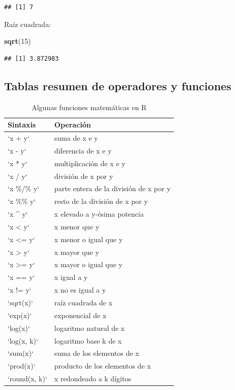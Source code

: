 \documentclass[]{book}
\newenvironment{Shaded}{\begin{snugshade}}{\end{snugshade}}
\newcommand{\KeywordTok}[1]{\textcolor[rgb]{0.13,0.29,0.53}{\textbf{#1}}}
\newcommand{\DecValTok}[1]{\textcolor[rgb]{0.00,0.00,0.81}{#1}}
\newcommand{\NormalTok}[1]{#1}
\begin{document}
\begin{verbatim}
## [1] 7
\end{verbatim}

Raíz cuadrada:

\begin{Shaded}
\begin{Highlighting}[]
\KeywordTok{sqrt}\NormalTok{(}\DecValTok{15}\NormalTok{)}
\end{Highlighting}
\end{Shaded}

\begin{verbatim}
## [1] 3.872983
\end{verbatim}

\hypertarget{tablas_resumen}{%
\subsection{Tablas resumen de operadores y
funciones}\label{tablas_resumen}}

\begin{longtable}[t]{ll}
\caption{\label{tab:funcbasic}Algunas funciones matemáticas en R}\\
\toprule
Sintaxis & Operación\\
\midrule
`x + y` & suma de x e y\\
`x - y` & diferencia de x e y\\
`x * y` & multiplicación de x e y\\
`x / y` & división de x por y\\
`x \%/\% y` & parte entera de la división de x por y\\
\addlinespace
`x \%\% y` & resto de la división de x por y\\
`x \textasciicircum{} y` & x elevado a y-ésima potencia\\
`x < y` & x menor que y\\
`x <= y` & x menor o igual que y\\
`x > y` & x mayor que y\\
\addlinespace
`x >= y` & x mayor o igual que y\\
`x == y` & x igual a y\\
`x != y` & x no es igual a y\\
`sqrt(x)` & raíz cuadrada de x\\
`exp(x)` & exponencial de x\\
\addlinespace
`log(x)` & logaritmo natural de x\\
`log(x, k)` & logaritmo base k de x\\
`sum(x)` & suma de los elementos de x\\
`prod(x)` & producto de los elementos de x\\
`round(x, k)` & x redondeado a k dígitos\\
\bottomrule
\end{longtable}
\end{document}
